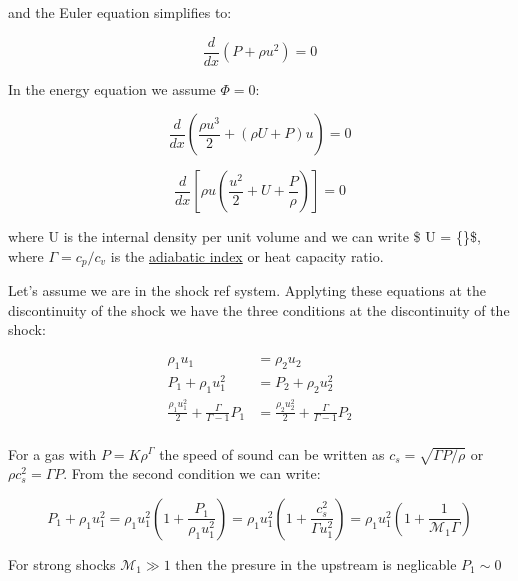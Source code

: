 \documentclass[
  letterpaper,
  DIV=11,
  numbers=noendperiod]{scrreprt}
\begin{document}
and the Euler equation simplifies to:

\[\frac{d}{dx}(P + \rho u^2) = 0\]

In the energy equation we assume \(\Phi = 0\):

\[\frac{d}{dx}\left(\frac{\rho u^3}{2} + (\rho U + P)u\right) = 0 \]

\[\frac{d}{dx}\left[ \rho u \left(\frac{u^2}{2} + U + \frac{P}{\rho}\right) \right] = 0 \]

where U is the internal density per unit volume and we can write \$
\rho U =  \{\}\$, where \(\Gamma = c_p/c_v\) is the
\href{http://en.wikipedia.org/wiki/Heat_capacity_ratio}{adiabatic index}
or heat capacity ratio.

\begin{tcolorbox}[enhanced jigsaw, colframe=quarto-callout-important-color-frame, opacitybacktitle=0.6, left=2mm, leftrule=.75mm, opacityback=0, colbacktitle=quarto-callout-important-color!10!white, breakable, bottomrule=.15mm, toprule=.15mm, colback=white, coltitle=black, bottomtitle=1mm, toptitle=1mm, titlerule=0mm, title=\textcolor{quarto-callout-important-color}{\faExclamation}\hspace{0.5em}{Conditions of discontinuity at the shochwave}, arc=.35mm, rightrule=.15mm]

Let's assume we are in the shock ref system. Applyting these equations
at the discontinuity of the shock we have the three conditions at the
discontinuity of the shock:

\[\begin{aligned}
\rho_1 u_1 &= \rho_2 u_2\\
P_1 + \rho_1 u_1^2 &= P_2 + \rho_2 u_2^2\\
\frac{\rho_1 u_1^2}{2} + \frac{\Gamma}{\Gamma - 1} P_1 &=\frac{\rho_2 u_2^2}{2} + \frac{\Gamma}{\Gamma - 1}  P_2\\
\end{aligned}\]

\end{tcolorbox}

For a gas with \(P = K \rho^\Gamma\) the speed of sound can be written
as \(c_s = \sqrt{\Gamma P / \rho}\) or \(\rho c_s^2 = \Gamma P\). From
the second condition we can write:

\[ P_1 + \rho_1 u_1^2 =  \rho_1 u_1^2 \left( 1 + \frac{P_1}{\rho_1 u_1^2}\right)  = \rho_1 u_1^2 \left( 1 + \frac{c_s^2}{\Gamma u_1^2}\right) = \rho_1 u_1^2 \left(1 + \frac{1}{\mathcal{M_1}\Gamma}\right) \]

For strong shocks \(\mathcal{M_1} \gg 1\) then the presure in the
upstream is neglicable \(P_1 \sim 0\)
\end{document}
